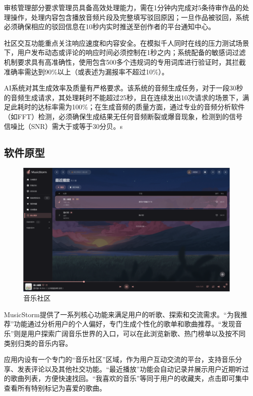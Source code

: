 \documentclass{base}
\numberwithin{figure}{section} %
\begin{document}
审核管理部分要求管理员具备高效处理能力，需在1分钟内完成对5条待审作品的处理操作，处理内容包含播放音频片段及完整填写驳回原因；一旦作品被驳回，系统必须确保相应的驳回信息在10秒内实时推送至创作者的平台通知中心。

社区交互功能重点关注响应速度和内容安全。在模拟千人同时在线的压力测试场景下，用户发布动态或评论的响应时间必须控制在1秒之内；系统配备的敏感词过滤机制要求具有高准确性，使用包含500多个违规词的专用词库进行验证时，其拦截准确率需达到90\%以上（或表述为漏报率不超过10\%）。

AI系统对其生成效率及质量有严格要求。该系统的音频生成任务，对于一段30秒的音频生成请求，其处理耗时不能超过25秒，且在连续发出10次请求的场景下，满足此耗时的达标率需为100\%；在生成音频的质量方面，通过专业的音频分析软件（如FFT）检测，必须确保生成结果无任何音频断裂或爆音现象，检测到的信号信噪比（SNR）需大于或等于30分贝。s

\subsection{软件原型}

\begin{figure}[H]
    \centering
    \includegraphics[width=\textwidth]{images/4-4-origin.png}
    \caption{音乐社区}
\end{figure}

MusicStorm提供了一系列核心功能来满足用户的听歌、探索和交流需求。“为我推荐”功能通过分析用户的个人偏好，专门生成个性化的歌单和歌曲推荐。“发现音乐”则是用户探索广阔音乐世界的入口，可以在此浏览新歌、热门榜单以及按不同类别归类的音乐内容。

应用内设有一个专门的“音乐社区”区域，作为用户互动交流的平台，支持音乐分享、发表评论以及其他社交功能。“最近播放”功能会自动记录并展示用户近期听过的歌曲列表，方便快速找回。“我喜欢的音乐”等同于用户的收藏夹，点击即可集中查看所有特别标记为喜爱的歌曲。
\end{document}
